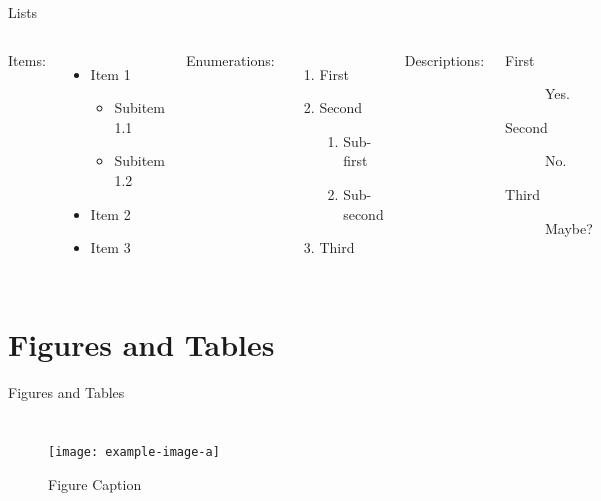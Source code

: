 \documentclass[11pt,xcolor={svgnames},aspectratio=169,usepdftitle=false,notheorems]{beamer}
\begin{document}
\begin{frame}{Lists}
	\begin{columns}[t, onlytextwidth]
			Items:
			\begin{itemize}
				\item Item 1
				\begin{itemize}
					\item Subitem 1.1
					\item Subitem 1.2
				\end{itemize}
				\item Item 2
				\item Item 3
			\end{itemize}
		
			Enumerations:
			\begin{enumerate}
				\item First
				\item Second
				\begin{enumerate}
					\item Sub-first
					\item Sub-second
				\end{enumerate}
				\item Third
			\end{enumerate}
		
			Descriptions:
			\begin{description}
				\item[First] Yes.
				\item[Second] No.
				\item[Third] Maybe?
			\end{description}
	\end{columns}
\end{frame}

\section{Figures and Tables}

\begin{frame}{Figures and Tables}
	\begin{columns}
			\begin{figure}
				\centering
				\texttt{[image: example-image-a]}
				\caption{Figure Caption}
				\label{fig:example_fig}
			\end{figure}
			
		\begin{table}[htbp]
			\centering
			\caption{Table Caption}
			\label{tab:calibration}
		\end{table}
	\end{columns}
\end{frame}
\end{document}
